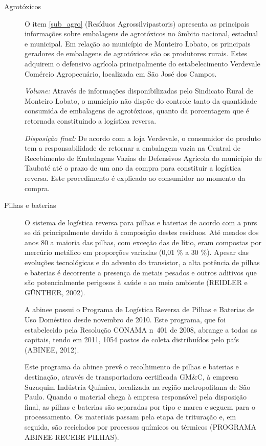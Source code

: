


\begin{description}
	\item[Agrotóxicos] O item \ref{sub_agro} (Resíduos Agrossilvipastoris) apresenta as principais informações sobre embalagens de agrotóxicos no âmbito nacional, estadual e municipal. Em relação ao município de Monteiro Lobato, os principais geradores de embalagens de agrotóxicos são os produtores rurais. Estes adquirem o defensivo agrícola principalmente do estabelecimento Verdevale Comércio Agropecuário, localizada em São José dos Campos.
	
	\subitem \textit{Volume:} 
	Através de informações disponibilizadas pelo Sindicato Rural de Monteiro Lobato, o município não dispõe do controle tanto da quantidade consumida de embalagens de agrotóxicos, quanto da porcentagem que é retornada constituindo a logística reversa. 
	
	\subitem \textit{Disposição final:}
	De acordo com a loja Verdevale, o consumidor do produto tem a responsabilidade de retornar a embalagem vazia na Central de Recebimento de Embalagens Vazias de Defensivos Agrícola do município de Taubaté até o prazo de um ano da compra para constituir a logística reversa. Este procedimento é explicado ao consumidor no momento da compra.	
	
	
	\item[Pilhas e baterias] O sistema de logística reversa para pilhas e baterias de acordo com a \gls{pnrs} se dá principalmente devido à composição destes resíduos. Até meados dos anos 80 a maioria das pilhas, com exceção das de lítio, eram compostas por mercúrio metálico em proporções variadas (0,01 \% a 30 \%). Apesar das evoluções tecnológicas e do advento do transistor, a alta potência de pilhas e baterias é decorrente a presença de metais pesados e outros aditivos que são potencialmente perigosos à saúde e ao meio ambiente (REIDLER e GÜNTHER, 2002).
	
	A \gls{abinee} possui o Programa de Logística Reversa de Pilhas e Baterias de Uso Doméstico desde novembro de 2010. Este programa, que foi estabelecido pela Resolução CONAMA n\textdegree\ 401 de 2008, abrange a todas as capitais, tendo em 2011, 1054 postos de coleta distribuídos pelo país (ABINEE, 2012).
	
	Este programa da \gls{abinee} prevê o recolhimento de pilhas e baterias e destinação, através de transportadora certificada GM\&C, à empresa Suzaquim Indústria Química, localizada na região metropolitana de São Paulo. Quando o material chega à empresa responsável pela disposição final, as pilhas e baterias são separadas por tipo e marca e seguem para o processamento. Os materiais passam pela etapa de trituração e, em seguida, são reciclados por processos químicos ou térmicos (PROGRAMA ABINEE RECEBE PILHAS).
	

\end{description}
